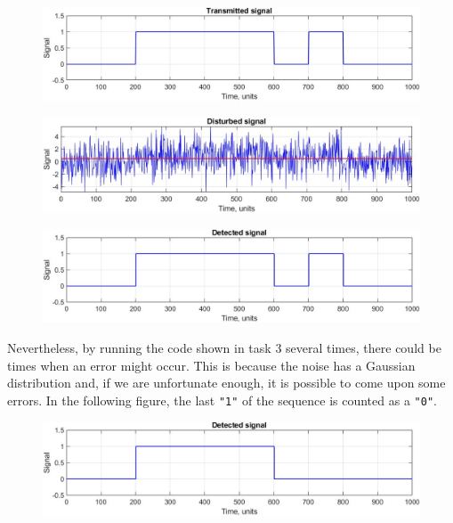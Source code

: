 \begin{figure}[h!]
    \centering
    \includegraphics[width = .85\textwidth]{lab-2/imgs/task4.4_Transmitted.jpg}
\end{figure}
\vspace{-15px}
\begin{figure}[h!]
    \centering
    \includegraphics[width = .85\textwidth]{lab-2/imgs/task4.4_Noise.jpg}
\end{figure}
\vspace{-15px}
\begin{figure}[h!]
    \centering
    \includegraphics[width = .85\textwidth]{lab-2/imgs/task4.4_Detected.jpg}
\end{figure}

\FloatBarrier\noindent Nevertheless, by running the code shown in task 3 several times, there could be times when an error might occur. This is because the noise has a Gaussian distribution and, if we are unfortunate enough, it is possible to come upon some errors. In the following figure, the last \texttt{"1"} of the sequence is counted as a \texttt{"0"}.

\begin{figure}[h!]
    \centering
    \includegraphics[width = .85\textwidth]{lab-2/imgs/task4.4_Detected_Error.jpg}
\end{figure}

